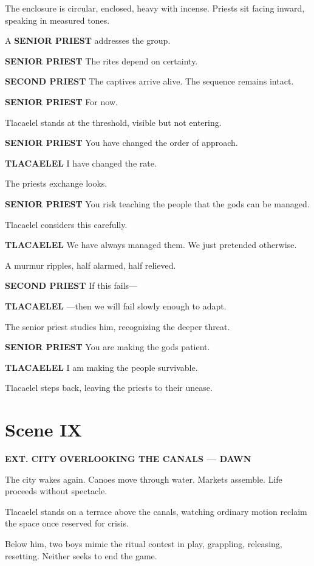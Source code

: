 \documentclass[12pt]{article}
\begin{document}
The enclosure is circular, enclosed, heavy with incense. Priests sit facing inward, speaking in measured tones.

A \textbf{SENIOR PRIEST} addresses the group.

\textbf{SENIOR PRIEST}  
The rites depend on certainty.

\textbf{SECOND PRIEST}  
The captives arrive alive. The sequence remains intact.

\textbf{SENIOR PRIEST}  
For now.

Tlacaelel stands at the threshold, visible but not entering.

\textbf{SENIOR PRIEST}  
You have changed the order of approach.

\textbf{TLACAELEL}  
I have changed the rate.

The priests exchange looks.

\textbf{SENIOR PRIEST}  
You risk teaching the people that the gods can be managed.

Tlacaelel considers this carefully.

\textbf{TLACAELEL}  
We have always managed them.  
We just pretended otherwise.

A murmur ripples, half alarmed, half relieved.

\textbf{SECOND PRIEST}  
If this fails—

\textbf{TLACAELEL}  
—then we will fail slowly enough to adapt.

The senior priest studies him, recognizing the deeper threat.

\textbf{SENIOR PRIEST}  
You are making the gods patient.

\textbf{TLACAELEL}  
I am making the people survivable.

Tlacaelel steps back, leaving the priests to their unease.

\section*{Scene IX}

\textbf{EXT. CITY OVERLOOKING THE CANALS --- DAWN}

The city wakes again. Canoes move through water. Markets assemble. Life proceeds without spectacle.

Tlacaelel stands on a terrace above the canals, watching ordinary motion reclaim the space once reserved for crisis.

Below him, two boys mimic the ritual contest in play, grappling, releasing, resetting. Neither seeks to end the game.
\end{document}
